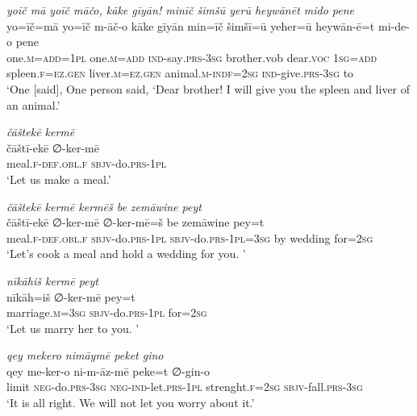\ea \label{ŽP.230}
\textit{yoīč mā yoīč māčo, kāke gīyān! minīč šimšū yerū heywānēt mido pene} \\ 
\gll yo=īč=mā yo=īč m-āč-o kāke gīyān min=īč šimšī=ū yeher=ū heywān-ē=t mi-de-o pene \\ 
 one\textsc{.m}\textsc{=add}\textsc{=1pl} one\textsc{.m}\textsc{=add} \textsc{ind-}say\textsc{.prs}\textsc{-3sg} brother.vob dear.\textsc{voc} \textsc{1sg}\textsc{=add} spleen\textsc{.f}\textsc{\textsc{=ez.gen}} liver\textsc{.m}\textsc{\textsc{=ez.gen}} animal\textsc{.m}\textsc{-indf}\textsc{=\textsc{2sg}} \textsc{ind-}give\textsc{.prs}\textsc{-3sg} to \\ 
\glt `One [said], One person said, ‘Dear brother! I will give you the spleen and liver of an animal.'
\z 
 
\ea \label{ŽP.231}
\textit{čāštekē kermē} \\ 
\gll čāštī-ekē ∅-ker-mē \\ 
 meal\textsc{.f}\textsc{-def}\textsc{.obl}\textsc{.f} \textsc{sbjv-}do\textsc{.prs}\textsc{-1pl} \\ 
\glt `Let us make a meal.'
\z 
 
\ea \label{ŽP.232}
\textit{čāštekē kermē kermēš be zemāwine peyt} \\ 
\gll čāštī-ekē ∅-ker-mē ∅-ker-mē=š be zemāwine pey=t \\ 
 meal\textsc{.f}\textsc{-def}\textsc{.obl}\textsc{.f} \textsc{sbjv-}do\textsc{.prs}\textsc{-1pl} \textsc{sbjv-}do\textsc{.prs}\textsc{-1pl}\textsc{=3sg} by wedding for\textsc{=\textsc{2sg}} \\ 
\glt `Let’s cook a meal and hold a wedding for you. '
\z 
 
\ea \label{ŽP.233}
\textit{nīkāhiš kermē peyt} \\ 
\gll nīkāh=iš ∅-ker-mē pey=t \\ 
 marriage\textsc{.m}\textsc{=3sg} \textsc{sbjv-}do\textsc{.prs}\textsc{-1pl} for\textsc{=\textsc{2sg}} \\ 
\glt `Let us marry her to you. '
\z 
 
\ea \label{ŽP.234}
\textit{qey mekero nimāymē peket gino} \\ 
\gll qey me-ker-o ni-m-āz-mē peke=t ∅-gin-o \\ 
 limit \textsc{neg-}do\textsc{.prs}\textsc{-3sg} \textsc{neg-}\textsc{ind-}let\textsc{.prs}\textsc{-1pl} strenght\textsc{.f}\textsc{=\textsc{2sg}} \textsc{sbjv-}fall\textsc{.prs}\textsc{-3sg} \\ 
\glt `It is all right. We will not let you worry about it.'
\z 
 
